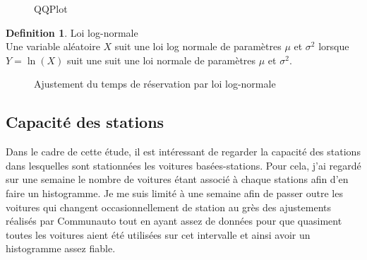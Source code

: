 \documentclass[12pt,a4paper]{article}
\theoremstyle{definition}
\newtheorem{definition}{Definition}
\begin{document}
{\begin{figure}[h]
\label{Qplot}
\centering
{}
\caption{QQPlot}
\end{figure}

\begin{definition}{Loi log-normale}\\
Une variable aléatoire $X$ suit une loi log normale de paramètres $\mu$ et $\sigma^2$ lorsque $Y = \ln(X)$ suit une suit une loi normale de paramètres $\mu$ et $\sigma^2$.
\end{definition}


\begin{figure}[!h]
\centering
{}
\caption{Ajustement du temps de réservation par loi log-normale}
\end{figure}

\subsection{Capacité des stations}
Dans le cadre de cette étude, il est intéressant de regarder la capacité des stations dans lesquelles sont stationnées les voitures basées-stations.
Pour cela, j'ai regardé sur une semaine le nombre de voitures étant associé à chaque stations afin d'en faire un histogramme. Je me suis limité à une semaine afin de passer outre les voitures qui changent occasionnellement de station au grès des ajustements réalisés par Communauto tout en ayant assez de données pour que quasiment toutes les voitures aient été utilisées sur cet intervalle et ainsi avoir un histogramme assez fiable.

}
\end{document}
